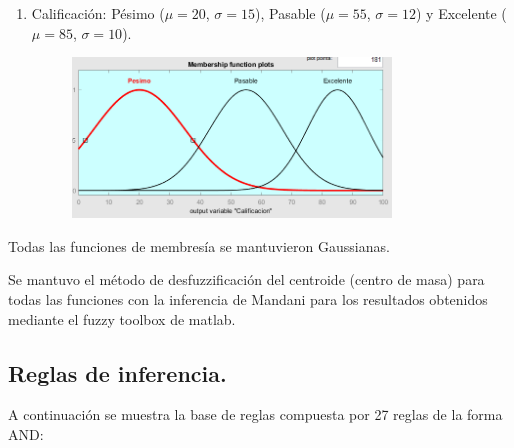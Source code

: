 \documentclass[11pt, letterpaper]{article}
\begin{document}
\begin{enumerate}
\begin{figure}[h]
	\end{figure}
	\newpage
	\item Calificación: Pésimo ($\mu = 20$, $\sigma = 15$), Pasable ($\mu = 55$, $\sigma = 12$) y Excelente ($\mu = 85$, $\sigma = 10$).
	\begin{figure}[h]
		\centering
		\includegraphics[width=0.8\textwidth]{IMG/P14.png}
	\end{figure}
\end{enumerate}

Todas las funciones de membresía se mantuvieron Gaussianas.

Se mantuvo el método de desfuzzificación del centroide (centro de masa) para todas las funciones con la inferencia de Mandani para los resultados obtenidos mediante el fuzzy toolbox de matlab.\\

\newpage

\subsection{Reglas de inferencia.}

A continuación se muestra la base de reglas compuesta por 27 reglas de la forma AND:
\end{document}
